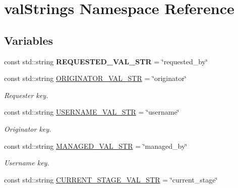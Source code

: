 \hypertarget{namespacevalStrings}{}\section{val\+Strings Namespace Reference}
\label{namespacevalStrings}
\subsection*{Variables}
\begin{DoxyCompactItemize}
\item 
const std\+::string {\bfseries R\+E\+Q\+U\+E\+S\+T\+E\+D\+\_\+\+V\+A\+L\+\_\+\+S\+TR} = \char`\"{}requested\+\_\+by\char`\"{}\hypertarget{namespacevalStrings_aa909e8831c4c217c5ee5ce64c277aca0}{}\label{namespacevalStrings_aa909e8831c4c217c5ee5ce64c277aca0}

\item 
const std\+::string \hyperlink{namespacevalStrings_aed74f88826f39e41536159c9436a0eae}{O\+R\+I\+G\+I\+N\+A\+T\+O\+R\+\_\+\+V\+A\+L\+\_\+\+S\+TR} = \char`\"{}originator\char`\"{}\hypertarget{namespacevalStrings_aed74f88826f39e41536159c9436a0eae}{}\label{namespacevalStrings_aed74f88826f39e41536159c9436a0eae}

\begin{DoxyCompactList}\small\item\em Requester key. \end{DoxyCompactList}\item 
const std\+::string \hyperlink{namespacevalStrings_ac308fc2bbcc1e35996ba86dbc97ef0eb}{U\+S\+E\+R\+N\+A\+M\+E\+\_\+\+V\+A\+L\+\_\+\+S\+TR} = \char`\"{}username\char`\"{}\hypertarget{namespacevalStrings_ac308fc2bbcc1e35996ba86dbc97ef0eb}{}\label{namespacevalStrings_ac308fc2bbcc1e35996ba86dbc97ef0eb}

\begin{DoxyCompactList}\small\item\em Originator key. \end{DoxyCompactList}\item 
const std\+::string \hyperlink{namespacevalStrings_af2446b29f372797fc7941c206d634f39}{M\+A\+N\+A\+G\+E\+D\+\_\+\+V\+A\+L\+\_\+\+S\+TR} = \char`\"{}managed\+\_\+by\char`\"{}\hypertarget{namespacevalStrings_af2446b29f372797fc7941c206d634f39}{}\label{namespacevalStrings_af2446b29f372797fc7941c206d634f39}

\begin{DoxyCompactList}\small\item\em Username key. \end{DoxyCompactList}\item 
const std\+::string \hyperlink{namespacevalStrings_aa41614fad0c6c7769070cf163dd4a6f0}{C\+U\+R\+R\+E\+N\+T\+\_\+\+S\+T\+A\+G\+E\+\_\+\+V\+A\+L\+\_\+\+S\+TR} = \char`\"{}current\+\_\+stage\char`\"{}\hypertarget{namespacevalStrings_aa41614fad0c6c7769070cf163dd4a6f0}{}\label{namespacevalStrings_aa41614fad0c6c7769070cf163dd4a6f0}


\end{DoxyCompactItemize}
